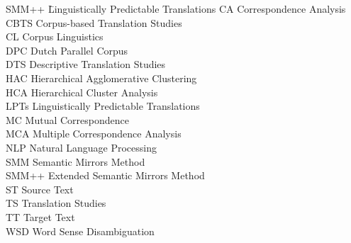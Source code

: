 \begin{tabbing}
SMM++\hspace{1em} \= Linguistically Predictable Translations\kill
CA    \>   Correspondence Analysis                  \\
CBTS  \>   Corpus-based Translation Studies         \\
CL    \>   Corpus Linguistics                       \\
DPC   \>   Dutch Parallel Corpus                    \\
DTS   \>   Descriptive Translation Studies          \\
HAC   \>   Hierarchical Agglomerative Clustering    \\
HCA   \>   Hierarchical Cluster Analysis            \\
LPTs  \>   Linguistically Predictable Translations  \\
MC    \>   Mutual Correspondence                    \\
MCA   \>   Multiple Correspondence Analysis         \\
NLP   \>   Natural Language Processing              \\
SMM   \>   Semantic Mirrors Method                  \\
SMM++ \>   Extended Semantic Mirrors Method         \\
ST \>   Source Text         
    \\
TS    \>   Translation Studies                      \\
TT    \>   Target Text
    \\
WSD   \>   Word Sense Disambiguation
\end{tabbing}
